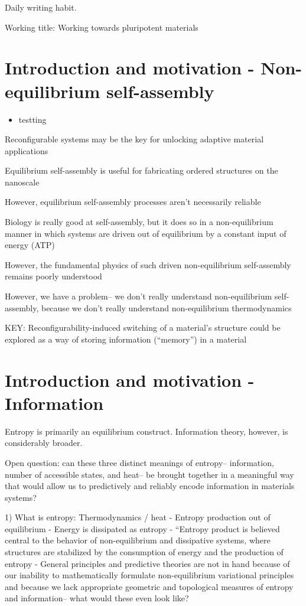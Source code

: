 \documentclass[11pt, oneside]{article}   	%
\begin{document}
Daily writing habit.

Working title: Working towards pluripotent materials

\section{Introduction and motivation - Non-equilibrium self-assembly}

\begin{itemize}
\item testting
\end{itemize}

Reconfigurable systems may be the key for unlocking adaptive material applications

Equilibrium self-assembly is useful for fabricating ordered structures on the nanoscale

However, equilibrium self-assembly processes aren't necessarily reliable 

Biology is really good at self-assembly, but it does so in a non-equilibrium manner in which systems are driven out of equilibrium by a constant input of energy (ATP)

However, the fundamental physics of such driven non-equilibrium self-assembly remains poorly understood

However, we have a problem-- we don't really understand non-equilibrium self-assembly, because we don't really understand non-equilibrium thermodynamics

KEY: 
Reconfigurability-induced switching of a material's structure could be explored as a way of storing information (``memory'') in a material

\section{Introduction and motivation - Information}

Entropy is primarily an equilibrium construct. Information theory, however, is considerably broader. 

Open question: can these three distinct meanings of entropy-- information, number of accessible states, and heat-- be brought together in a meaningful way that would allow us to predictively and reliably encode information in materials systems?

1) What is entropy: Thermodynamics / heat - Entropy production out of equilibrium
- Energy is dissipated as entropy
- ``Entropy product is believed central to the behavior of non-equilibrium and dissipative systems, where structures are stabilized by the consumption of energy and the production of entropy
- General principles and predictive theories are not in hand because of our inability to mathematically formulate non-equilibrium variational principles and because we lack appropriate geometric and topological measures of entropy and information-- what would these even look like?
\end{document}
